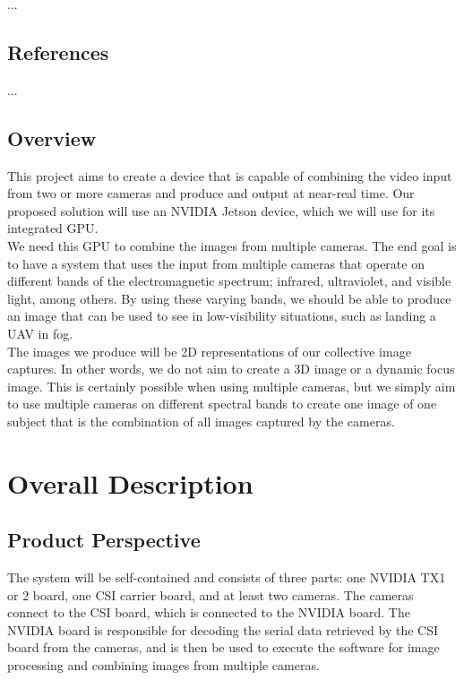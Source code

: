 \documentclass[letterpaper,10pt,serif,draftclsnofoot,onecolumn,compsoc,titlepage]{IEEEtran}
\begin{document}
...

\subsection{References}

...

\subsection{Overview}

This project aims to create a device that is capable of combining the video input from 
two or more cameras and produce and output at near-real time. Our proposed solution 
will use an NVIDIA Jetson device, which we will use for its integrated GPU.\\

We need this GPU to combine the images from multiple cameras. The end goal is to have 
a system that uses the input from multiple cameras that operate on different bands of 
the electromagnetic spectrum; infrared, ultraviolet, and visible light, among others. 
 By using these varying bands, we should be able to produce an image that can be used 
 to see in low-visibility situations, such as landing a UAV in fog.\\

The images we produce will be 2D representations of our collective image captures. In 
other words, we do not aim to create a 3D image or a dynamic focus image. This is 
certainly possible when using multiple cameras, but we simply aim to use multiple 
cameras on different spectral bands to create one image of one subject that is the 
combination of all images captured by the cameras.\\


\section{Overall Description}

\subsection{Product Perspective}

The system will be self-contained and consists of three parts: one NVIDIA TX1 or 2 board, 
one CSI carrier board, and at least two cameras. The cameras connect to the CSI board, 
which is connected to the NVIDIA board. The NVIDIA board is responsible for decoding 
the serial data retrieved by the CSI board from the cameras, and is then be used to 
execute the software for image processing and combining images from multiple cameras.\\
\end{document}
